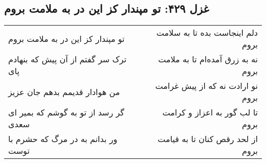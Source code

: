 \begin{center}
\section*{غزل ۴۲۹: تو مپندار کز این در به ملامت بروم}
\label{sec:429}
\begin{longtable}{l p{0.5cm} r}
تو مپندار کز این در به ملامت بروم
&&
دلم اینجاست بده تا به سلامت بروم
\\
ترک سر گفتم از آن پیش که بنهادم پای
&&
نه به زرق آمده‌ام تا به ملامت بروم
\\
من هوادار قدیمم بدهم جان عزیز
&&
نو ارادت نه که از پیش غرامت بروم
\\
گر رسد از تو به گوشم که بمیر ای سعدی
&&
تا لب گور به اعزاز و کرامت بروم
\\
ور بدانم به در مرگ که حشرم با توست
&&
از لحد رقص کنان تا به قیامت بروم
\\
\end{longtable}
\end{center}

